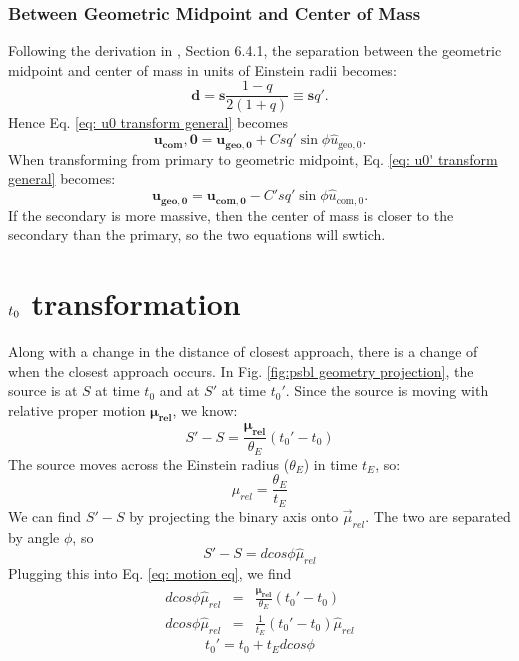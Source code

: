 \documentclass[twocolumn]{aastex701}
\newcommand{\vect}[1]{\boldsymbol{#1}}
\begin{document}
\subsubsection{Between Geometric Midpoint and Center of Mass}
Following the derivation in \cite{Casey_Thesis}, Section 6.4.1, the separation between the geometric midpoint and center of mass in units of Einstein radii becomes:
\begin{equation}
    \vect{d} = \vect{s}\frac{1 - q}{2(1 + q)} \equiv \vect{s}q'.
\end{equation}
Hence Eq. \ref{eq: u0 transform general} becomes
\begin{equation}
    \vect{u_{\textrm{com}}, 0} = \vect{u_{ \textrm{geo}, 0}} + Csq'\sin\phi\hat{u}_{\textrm{geo}, 0}.
\end{equation}
When transforming from primary to geometric midpoint, Eq. \ref{eq: u0' transform general} becomes:
\begin{equation}
    \vect{u_{\textrm{geo},0}} = \vect{u_{\textrm{com},0}} - C'sq'\sin\phi\hat{u}_{\textrm{com}, 0}.
\end{equation}
If the secondary is more massive, then the center of mass is closer to the secondary than the primary, so the two equations will swtich.



\section{$\lowercase{t}_0$ transformation}
\label{sec:t0}

Along with a change in the distance of closest approach, there is a change of when the closest approach occurs. In Fig. \ref{fig:psbl geometry projection}, the source is at $S$ at time $t_0$ and at $S'$ at time $t_0'$. Since the source is moving with relative proper motion $\boldsymbol{\mu_{rel}}$, we know:
\begin{equation}
    \label{eq: motion eq}
    S' - S = \frac{\vect{\mu_{rel}}}{\theta_E}(t_0' - t_0)
\end{equation}
The source moves across the Einstein radius ($\theta_E$) in time $t_E$, so:
\begin{equation}
    \mu_{rel} = \frac{\theta_E}{t_E}
\end{equation}
We can find $S' - S$ by projecting the binary axis onto $\vec{\mu}_{rel}$. The two are separated by angle $\phi$, so 
\begin{equation}
    S' - S = dcos\phi \hat{\mu}_{rel}
\end{equation}
Plugging this into Eq. \ref{eq: motion eq}, we find
\begin{eqnarray}
    dcos\phi \hat{\mu}_{rel} &=& \frac{\vect{\mu_{rel}}}{\theta_E}(t_0' - t_0) \\
    dcos\phi \hat{\mu}_{rel} &=& \frac{1}{t_E}(t_0' - t_0) \hat{\mu}_{rel}
\end{eqnarray}
\begin{equation}
\label{eq: t0 transform}
    \boxed{t_0' = t_0 + t_E d cos\phi}
\end{equation}
\end{document}
